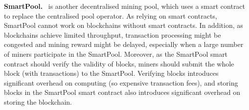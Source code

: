 \textbf{SmartPool.}~\cite{luu2017smartpool} is another decentralised mining pool, which uses a smart contract to replace the centralised pool operator.
As relying on smart contracts, SmartPool cannot work on blockchains without smart contracts.
In addition, as blockchains achieve limited throughput, transaction processing might be congested and mining reward might be delayed, especially when a large number of miners participate in the SmartPool.
Moreover, as the SmartPool smart contract should verify the validity of blocks, miners should submit the whole block (with transactions) to the SmartPool.
Verifying blocks introduces significant overhead on computing (so expensive transaction fees), and storing blocks in the SmartPool smart contract also introduces significant overhead on storing the blockchain.

